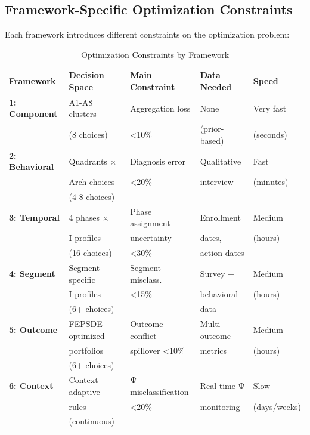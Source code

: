 \subsection{Framework-Specific Optimization Constraints}

Each framework introduces different constraints on the optimization problem:

\begin{table}[htbp]
\centering
\caption{Optimization Constraints by Framework}
\label{tab:20-optimization-constraints}
\renewcommand{\arraystretch}{1.3}
\small
\begin{tabular}{@{}lllll@{}}
\toprule
\textbf{Framework} & \textbf{Decision Space} & \textbf{Main Constraint} & \textbf{Data Needed} & \textbf{Speed} \\
\midrule
\textbf{1: Component} & A1-A8 clusters & Aggregation loss & None & Very fast \\
& (8 choices) & <10\% & (prior-based) & (seconds) \\
\midrule
\textbf{2: Behavioral} & Quadrants × & Diagnosis error & Qualitative & Fast \\
& Arch choices & <20\% & interview & (minutes) \\
& (4-8 choices) & & & \\
\midrule
\textbf{3: Temporal} & 4 phases × & Phase assignment & Enrollment & Medium \\
& I-profiles & uncertainty & dates, & (hours) \\
& (16 choices) & <30\% & action dates & \\
\midrule
\textbf{4: Segment} & Segment-specific & Segment misclass. & Survey + & Medium \\
& I-profiles & <15\% & behavioral & (hours) \\
& (6+ choices) & & data & \\
\midrule
\textbf{5: Outcome} & FEPSDE-optimized & Outcome conflict & Multi-outcome & Medium \\
& portfolios & spillover <10\% & metrics & (hours) \\
& (6+ choices) & & & \\
\midrule
\textbf{6: Context} & Context-adaptive & Ψ misclassification & Real-time Ψ & Slow \\
& rules & <20\% & monitoring & (days/weeks) \\
& (continuous) & & & \\
\bottomrule
\end{tabular}
\end{table}

